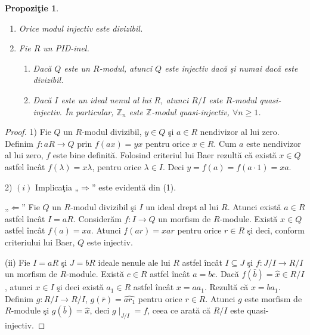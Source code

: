 \documentclass[12pt,a4paper]{book}
\theoremstyle{plain}
\newtheorem{proposition}[theorem]{Propoziţie}
\theoremstyle{definition}
\theoremstyle{remark}
\begin{document}
\begin{proposition}
\leavevmode
\begin{enumerate}
\item Orice modul injectiv este divizibil.
\item Fie \(R\) un PID-inel.
  \begin{enumerate}
    \item[(i)] Dacă \(Q\) este un \(R\)-modul, atunci \(Q\) este injectiv dacă şi numai dacă este divizibil.
    \item[(ii)] Dacă \(I\) este un ideal nenul al lui \(R\), atunci \(R/I\) este \(R\)-modul quasi-injectiv. 
          În particular, \(\mathbb{Z}_n\) este \(\mathbb{Z}\)-modul quasi-injectiv, \(\forall n \ge 1\).
  \end{enumerate}
\end{enumerate}
\end{proposition}


\begin{proof}
1) Fie \(Q\) un \(R\)-modul divizibil, \(y \in Q\) şi \(a \in R\) nendivizor al lui zero. Definim  
\(f : aR \to Q\) prin \(f(ax) = yx\) pentru orice \(x \in R\).  
Cum \(a\) este nendivizor al lui zero, \(f\) este bine definită.  
Folosind criteriul lui Baer rezultă că există \(x \in Q\) astfel încât  
\(f(\lambda) = x\lambda\), pentru orice \(\lambda \in I\).  
Deci \(y = f(a) = f(a \cdot 1) = xa\).

2) \((i)\) Implicaţia „\(\Rightarrow\)” este evidentă din (1).

„\(\Leftarrow\)” Fie \(Q\) un \(R\)-modul divizibil şi \(I\) un ideal drept al lui \(R\).  
Atunci există \(a \in R\) astfel încât \(I = aR\).  
Considerăm \(f : I \to Q\) un morfism de \(R\)-module.  
Există \(x \in Q\) astfel încât \(f(a) = xa\).  
Atunci \(f(ar) = xar\) pentru orice \(r \in R\) şi deci, conform criteriului lui Baer,  
\(Q\) este injectiv.

(ii) Fie \(I = aR\) şi \(J = bR\) ideale nenule ale lui \(R\) astfel încât \(I \subseteq J\) şi  
\(f : J/I \to R/I\) un morfism de \(R\)-module.  
Există \(c \in R\) astfel încât \(a = bc\).  
Dacă \(f(\bar{b}) = \hat{x} \in R/I\), atunci \(x \in I\) şi deci există \(a_1 \in R\) astfel încât  
\(x = aa_1\).  
Rezultă că \(x = ba_1\).  
Definim \(g : R/I \to R/I\), \(g(\bar{r}) = \widehat{ar_1}\) pentru orice \(r \in R\).  
Atunci \(g\) este morfism de \(R\)-module şi \(g(\bar{b}) = \hat{x}\),  
deci \(g\!\mid_{J/I} = f\), ceea ce arată că \(R/I\) este quasi-injectiv.
\end{proof}
\end{document}
